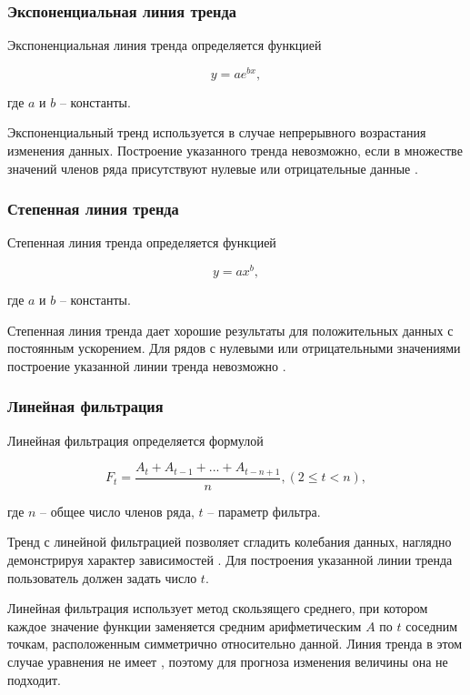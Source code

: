 \documentclass{bmstu}
\begin{document}
\subsubsection*{Экспоненциальная линия тренда}

Экспоненциальная линия тренда определяется функцией

\begin{equation}
	y = a e ^ {bx},
\end{equation}

где $a$ и $b$ -- константы.

Экспоненциальный тренд используется в случае непрерывного возрастания изменения данных. Построение указанного тренда не­возможно, если в множестве значений членов ряда присутствуют нулевые или отрицательные данные \cite{lt_exel}.

\subsubsection*{Степенная линия тренда}

Степенная линия тренда определяется функцией

\begin{equation}
	y = a x ^ b,
\end{equation}

где $a$ и $b$ -- константы.

Степенная линия тренда дает хорошие результаты для положительных данных с постоянным ускорением. Для рядов с нулевыми или отрицательными значениями построение указанной линии трен­да невозможно \cite{lt_exel}.

\subsubsection*{Линейная фильтрация}

Линейная фильтрация определяется формулой

\begin{equation}
	F_t = \frac{A_t + A_{t-1} + ... + A_{t-n+1}}{n}, (2 \leqslant t < n),
\end{equation}

где $n$ -- общее число членов ряда, $t$ -- параметр фильтра.

Тренд с линейной фильтрацией позволяет сгладить колебания данных, наглядно демонстрируя характер зависимостей \cite{lt_exel}. Для построения указанной линии тренда пользователь должен задать число $t$.

Линейная фильтрация использует метод скользящего среднего, при котором каждое значение функции заменяется средним арифметическим $A$ по $t$ соседним точкам, расположенным симметрично относительно данной. Линия тренда в этом случае уравнения не имеет \cite{lin_filt}, поэтому для прогноза изменения величины она не подходит.
\end{document}
